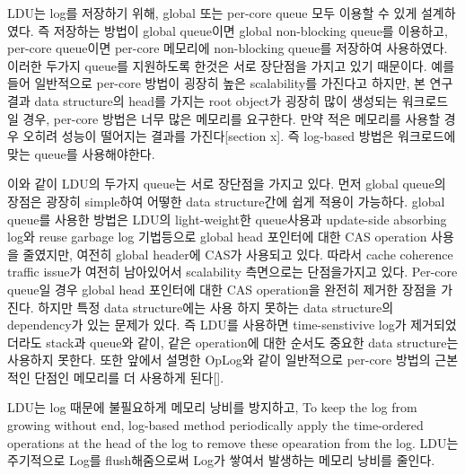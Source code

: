 
\ifkor
LDU는 log를 저장하기 위해, global 또는 per-core queue 모두 이용할 수 있게 설계하였다.
즉 저장하는 방법이 global queue이면 global non-blocking queue를 이용하고, per-core queue이면
per-core 메모리에 non-blocking queue를 저장하여 사용하였다. 
이러한 두가지 queue를 지원하도록 한것은 서로 장단점을 가지고 있기 때문이다.
예를 들어 일반적으로 per-core 방법이 굉장히 높은 scalability를 가진다고 하지만, 본 연구 결과 data
structure의 head를 가지는 root object가 굉장히 많이 생성되는 워크로드일 경우,
per-core 방법은 너무 많은 메모리를 요구한다.
만약 적은 메모리를 사용할 경우 오히려 성능이 떨어지는 결과를 가진다[section x].
즉 log-based 방법은 워크로드에 맞는 queue를 사용해야한다. 

이와 같이 LDU의 두가지 queue는 서로 장단점을 가지고 있다. 
먼저 global queue의 장점은 광장히 simple하여 어떻한 data structure간에 쉽게 적용이 가능하다.
global queue를 사용한 방법은 LDU의 light-weight한 queue사용과 update-side absorbing log와
reuse garbage log 기법등으로 global head 포인터에 대한 CAS operation 사용을 줄였지만, 여전히 global
header에 CAS가 사용되고 있다. 
따라서 cache coherence traffic issue가 여전히 남아있어서 scalability 측면으로는 단점을가지고 있다.
Per-core queue일 경우 global head 포인터에 대한 CAS operation을 완전히 제거한 장점을 가진다.
하지만 특정 data structure에는 사용 하지 못하는 data structure의 dependency가 있는 문제가 있다.
즉 LDU를 사용하면 time-senstivive log가 제거되었더라도 stack과 queue와 같이, 같은 operation에 대한 순서도
중요한 data structure는 사용하지 못한다.
또한 앞에서 설명한 OpLog와 같이 일반적으로 per-core 방법의 근본적인 단점인 메모리를 더 사용하게 된다[].  
\else

\fi



\ifkor
LDU는 log 때문에 불필요하게 메모리 낭비를 방지하고, To keep the log from growing without end,
log-based method periodically apply the time-ordered operations at the head of
the log to remove these opearation from the log.
LDU는 주기적으로 Log를 flush해줌으로써 Log가 쌓여서 발생하는 메모리 낭비를 줄인다.
\else
\fi



